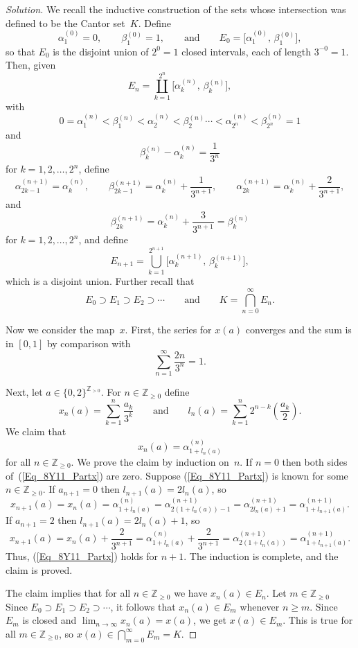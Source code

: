 \documentclass[10pt]{amsart}
\newcommand{\I}{\infty}
\newcommand{\limi}[1]{\lim_{{#1} \to \infty}}
\theoremstyle{definition}
\newcommand{\af}{\alpha}
\newcommand{\bt}{\beta}
\newcommand{\N}{{\mathbb{Z}}_{> 0}}
\newcommand{\Nz}{{\mathbb{Z}}_{\geq 0}}
\newcommand{\A}{\qquad {\mbox{and}} \qquad}
\begin{document}
\begin{proof}[Solution]
We recall the inductive construction of the sets whose
intersection was defined to be the Cantor set~$K$.
Define
\[
\af_1^{(0)} = 0,
\qquad
\bt_1^{(0)} = 1,
\A
E_0 = \bigl[ \af_1^{(0)}, \, \bt_1^{(0)} \bigr],
\]
so that $E_0$ is the disjoint union of $2^0 = 1$
closed intervals, each of length $3^{- 0} = 1$.
Then, given
\[
E_n = \coprod_{k = 1}^{2^n} \bigl[ \af_k^{(n)}, \, \bt_k^{(n)} \bigr],
\]
with
\[
0 = \af_1^{(n)} < \bt_1^{(n)} < \af_2^{(n)} < \bt_2^{(n)}
  \cdots < \af_{2^n}^{(n)} < \bt_{2^n}^{(n)} = 1
\]
and
\[
\bt_k^{(n)} - \af_k^{(n)} = \frac{1}{3^n}
\]
for $k = 1, 2, \ldots, 2^n$,
define
\[
\af_{2 k - 1}^{(n + 1)} = \af_k^{(n)},
\qquad
\bt_{2 k - 1}^{(n + 1)} = \af_k^{(n)} + \frac{1}{3^{n + 1}},
\qquad
\af_{2 k}^{(n + 1)} = \af_k^{(n)} + \frac{2}{3^{n + 1}},
\]
and
\[
\bt_{2 k}^{(n + 1)}
 = \af_k^{(n)} + \frac{3}{3^{n + 1}}
 = \bt_k^{(n)}
\]
for $k = 1, 2, \ldots, 2^n$,
and define
\[
E_{n + 1}
 = \bigcup_{k = 1}^{2^{n + 1}}
     \bigl[ \af_k^{(n + 1)}, \, \bt_k^{(n + 1)} \bigr],
\]
which is a disjoint union.
Further recall that
\[
E_0 \supset E_1 \supset E_2 \supset \cdots
\A
K = \bigcap_{n = 0}^{\I} E_n.
\]

Now we consider the map~$x$.
First,
the series for $x (a)$ converges
and the sum is in $[0, 1]$ by comparison with
\[
\sum_{n = 1}^{\I} \frac{2n}{3^n} = 1.
\]

Next, let $a \in \{ 0, 2 \}^{\N}$.
For $n \in \Nz$ define
\[
x_n (a) = \sum_{k = 1}^{n} \frac{a_k}{3^k}
\A
l_n (a) = \sum_{k = 1}^{n} 2^{n - k} \left( \frac{a_k}{2} \right).
\]
We claim that
%
\begin{equation}\label{Eq_8Y11_Partx}
x_n (a) = \af_{1 + l_n (a)}^{(n)}
\end{equation}
%
for all $n \in \Nz$.
We prove the claim by induction on~$n$.
If $n = 0$ then both sides of~(\ref{Eq_8Y11_Partx}) are zero.
Suppose (\ref{Eq_8Y11_Partx}) is known for some $n \in \Nz$.
If $a_{n + 1} = 0$ then
$l_{n + 1} (a) = 2 l_n (a)$,
so
\[
x_{n + 1} (a)
  = x_n (a)
  = \af_{1 + l_n (a)}^{(n)}
  = \af_{2 (1 + l_n (a)) - 1}^{(n + 1)}
  = \af_{2 l_n (a) + 1}^{(n + 1)}
  = \af_{1 + l_{n + 1} (a)}^{(n + 1)}.
\]
If $a_{n + 1} = 2$ then
$l_{n + 1} (a) = 2 l_n (a) + 1$,
so
\[
x_{n + 1} (a)
  = x_n (a) + \frac{2}{3^{n + 1}}
  = \af_{1 + l_n (a)}^{(n)} + \frac{2}{3^{n + 1}}
  = \af_{2 (1 + l_n (a))}^{(n + 1)}
  = \af_{1 + l_{n + 1} (a)}^{(n + 1)}.
\]
Thus, (\ref{Eq_8Y11_Partx}) holds for $n + 1$.
The induction is complete,
and the claim is proved.

The claim implies that for all $n \in \Nz$ we have $x_n (a) \in E_n$.
Let $m \in \Nz$
Since $E_0 \supset E_1 \supset E_2 \supset \cdots$,
it follows that
$x_n (a) \in E_m$ whenever $n \geq m$.
Since $E_m$ is closed and $\limi{n} x_n (a) = x (a)$,
we get $x (a) \in E_m$.
This is true for all $m \in \Nz$,
so $x (a) \in \bigcap_{m = 0}^{\I} E_m = K$.


\end{proof}
\end{document}
